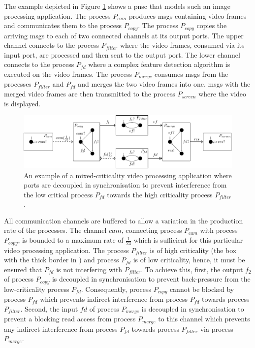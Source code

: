 The example depicted in Figure \ref{fig_mc_pnsc_ex} shows a \gls{pnsc} that models such an image processing application.
The process $P_{cam}$ produces \glspl*{msg} containing video frames and communicates them to the process $P_{copy}$.
The process $P_{copy}$ copies the arriving \glspl*{msg} to each of two connected channels at its output ports.
The upper channel connects to the process $P_{filter}$ where the video frames, consumed via its input port, are processed and then sent to the output port.
The lower channel connects to the process $P_{fd}$ where a complex feature detection algorithm is executed on the video frames.
The process $P_{merge}$ consumes \glspl*{msg} from the processes $P_{filter}$ and $P_{fd}$ and merges the two video frames into one.
\Glspl*{msg} with the merged video frames are then transmitted to the process $P_{screen}$ where the video is displayed.
\begin{figure}[bht]\begin{center}
\TopFigSpace
    \centering
    \includegraphics[width=\linewidth]{fig/mc_pnsc_ex.pdf}
    \CaptionFigSpace
    \caption{An example of a mixed-criticality video processing application where ports are decoupled in synchronisation to prevent interference from the low critical process $P_{fd}$ towards the high criticality process $P_{filter}$.}
    \label{fig_mc_pnsc_ex}
\BotFigSpace
\end{center}\end{figure}

All communication channels are buffered to allow a variation in the production rate of the processes.
The channel $cam$, connecting process $P_{cam}$ with process $P_{copy}$, is bounded to a maximum rate of $\frac{1}{24}$ which is sufficient for this particular video processing application.
The process $P_{filter}$ is of high criticality (the box with the thick border in \Fig{\ref{fig_mc_pnsc_ex}}) and process $P_{fd}$ is of low criticality, hence, it must be ensured that $P_{fd}$ is not interfering with $P_{filter}$.
To achieve this, first, the output $f_2$ of process $P_{copy}$ is decoupled in synchronisation to prevent back-pressure from the low-criticality process $P_{fd}$.
Consequently, process $P_{copy}$ cannot be blocked by process $P_{fd}$ which prevents indirect interference from process $P_{fd}$ towards process $P_{filter}$.
Second, the input $fd$ of process $P_{merge}$ is decoupled in synchronisation to prevent a blocking read access from process $P_{merge}$ to this channel which prevents any indirect interference from process $P_{fd}$ towards process $P_{filter}$ via process $P_{merge}$.

